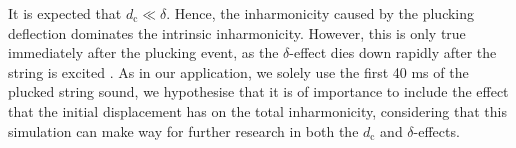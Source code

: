 \documentclass{article}
\begin{document}
\begin{sloppy}
% 
% 
% 
% 
% 
%
It is expected that $d_\text{c}\ll\delta$. %
Hence, the inharmonicity caused by the plucking deflection dominates the intrinsic inharmonicity. However, this is only true immediately after the plucking event, as the $  \delta$-effect dies down rapidly after the string is excited \cite{rossing:science_of_string_instruments}. %
As in our application, we solely use the first 40 ms of the plucked string sound, we hypothesise that it is of importance to include the effect that the initial displacement has on the total inharmonicity, considering that this simulation can make way for further research in both the $d_\text{c}$ and $\delta$-effects.
%

\end{sloppy}
\end{document}
